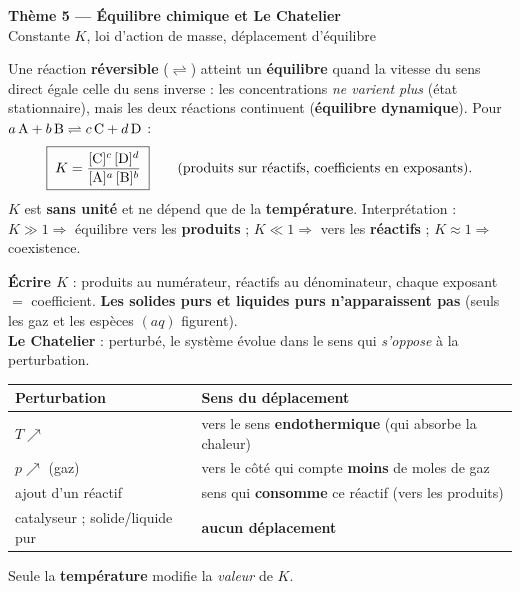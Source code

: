 \documentclass[11pt,a4paper]{article}
\begin{document}
\begin{center}
{\Large\bfseries\color{primarydark} Thème 5 — Équilibre chimique et Le Chatelier}\\[2pt]
{\color{primary}\small Constante $K$, loi d'action de masse, déplacement d'équilibre}
\end{center}

\begin{cle}
Une réaction \textbf{réversible} ($\rightleftharpoons$) atteint un \textbf{équilibre} quand la vitesse du sens direct égale celle du sens inverse : les concentrations \emph{ne varient plus} (état stationnaire), mais les deux réactions continuent (\textbf{équilibre dynamique}). Pour $a\,\ce{A} + b\,\ce{B} \rightleftharpoons c\,\ce{C} + d\,\ce{D}$ :
\[ \boxed{\;K = \dfrac{[\ce{C}]^{c}\,[\ce{D}]^{d}}{[\ce{A}]^{a}\,[\ce{B}]^{b}}\;} \qquad\text{(produits sur réactifs, coefficients en exposants).} \]
$K$ est \textbf{sans unité} et ne dépend que de la \textbf{température}. Interprétation : $K\gg 1 \Rightarrow$ équilibre vers les \textbf{produits} ; $K\ll 1 \Rightarrow$ vers les \textbf{réactifs} ; $K\approx 1 \Rightarrow$ coexistence.
\end{cle}

\begin{methode}
\textbf{Écrire $K$} : produits au numérateur, réactifs au dénominateur, chaque exposant $=$ coefficient. \textbf{Les solides purs et liquides purs n'apparaissent pas} (seuls les gaz et les espèces $(aq)$ figurent).\\[3pt]
\textbf{Le Chatelier} : perturbé, le système évolue dans le sens qui \emph{s'oppose} à la perturbation.
\renewcommand{\arraystretch}{1.25}
\begin{center}\small
\begin{tabular}{@{}>{\raggedright\arraybackslash}p{4.0cm}>{\raggedright\arraybackslash}p{9.3cm}@{}}
\toprule
\textbf{Perturbation} & \textbf{Sens du déplacement}\\
\midrule
$T \nearrow$ & vers le sens \textbf{endothermique} (qui absorbe la chaleur)\\
$p \nearrow$ (gaz) & vers le côté qui compte \textbf{moins} de moles de gaz\\
ajout d'un réactif & sens qui \textbf{consomme} ce réactif (vers les produits)\\
catalyseur ; solide/liquide pur & \textbf{aucun déplacement}\\
\bottomrule
\end{tabular}
\end{center}
\renewcommand{\arraystretch}{1.0}
Seule la \textbf{température} modifie la \emph{valeur} de $K$.
\end{methode}
\end{document}
